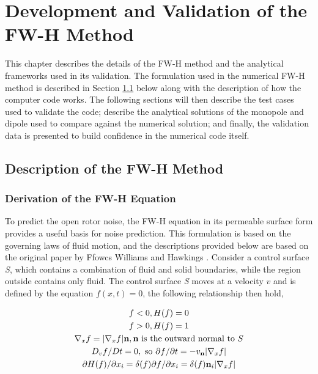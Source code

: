 
\chapter{Development and Validation of the FW-H Method} \label{ch:background_validation}

This chapter describes the details of the FW-H method and the analytical frameworks used in its validation. The formulation used in the numerical FW-H method is described in Section \ref{sec:FWH_desc} below along with the description of how the computer code works. The following sections will then describe the test cases used to validate the code; describe the analytical solutions of the monopole and dipole used to compare against the numerical solution; and finally, the validation data is presented to build confidence in the numerical code itself.

\section{Description of the FW-H Method}\label{sec:FWH_desc}
\subsection{Derivation of the FW-H Equation}\label{subsec:FWH_derivation}

To predict the open rotor noise, the FW-H equation in its permeable surface form provides a useful basis for noise prediction. This formulation is based on the governing laws of fluid motion, and the descriptions provided below are based on the original paper by Ffowcs Williams and Hawkings \cite{FfowcsWilliams1969}. Consider a control surface \textit{S}, which contains a combination of fluid and solid boundaries, while the region outside contains only fluid. The control surface \textit{S} moves at a velocity $v$ and is defined by the equation $f(x,t)=0$, the following relationship then hold,

\begin{gather}
    f < 0, H(f) = 0 \nonumber \\
    f > 0, H(f) = 1 \nonumber \\
    \nabla_x f = |\nabla_x f|\textbf{n}, \text{\textbf{n} is the outward normal to } S \\
    D_v f /Dt = 0, \text{ so } \partial f / \partial t = -v_{\textbf{n}}|\nabla_x f| \nonumber \\
    \partial H(f) / \partial x_i = \delta(f) \partial f / \partial x_i = \delta(f)\textbf{n}_i|\nabla_x f| \nonumber
\end{gather}


